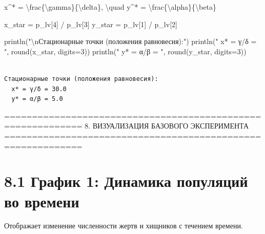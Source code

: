 \documentclass[
  12pt,
  a4paper,
  DIV=11,
  numbers=noendperiod]{scrreprt}
\newenvironment{Shaded}{\begin{snugshade}}{\end{snugshade}}
\newcommand{\FloatTok}[1]{\textcolor[rgb]{0.68,0.00,0.00}{#1}}
\newcommand{\FunctionTok}[1]{\textcolor[rgb]{0.28,0.35,0.67}{#1}}
\newcommand{\NormalTok}[1]{\textcolor[rgb]{0.00,0.23,0.31}{#1}}
\newcommand{\OperatorTok}[1]{\textcolor[rgb]{0.37,0.37,0.37}{#1}}
\newcommand{\SpecialCharTok}[1]{\textcolor[rgb]{0.37,0.37,0.37}{#1}}
\newcommand{\StringTok}[1]{\textcolor[rgb]{0.13,0.47,0.30}{#1}}
\begin{document}
\begin{Shaded}
\begin{Highlighting}[]
\NormalTok{x\^{}* = \textbackslash{}frac\{\textbackslash{}gamma\}\{\textbackslash{}delta\}, \textbackslash{}quad y\^{}* = \textbackslash{}frac\{\textbackslash{}alpha\}\{\textbackslash{}beta\}}
\end{Highlighting}
\end{Shaded}

\begin{Shaded}
\begin{Highlighting}[]
\NormalTok{x\_star }\OperatorTok{=}\NormalTok{ p\_lv[}\FloatTok{4}\NormalTok{] }\OperatorTok{/}\NormalTok{ p\_lv[}\FloatTok{3}\NormalTok{]}
\NormalTok{y\_star }\OperatorTok{=}\NormalTok{ p\_lv[}\FloatTok{1}\NormalTok{] }\OperatorTok{/}\NormalTok{ p\_lv[}\FloatTok{2}\NormalTok{]}

\FunctionTok{println}\NormalTok{(}\StringTok{"}\SpecialCharTok{\textbackslash{}n}\StringTok{Стационарные точки (положения равновесия):"}\NormalTok{)}
\FunctionTok{println}\NormalTok{(}\StringTok{"  x* = γ/δ = "}\NormalTok{, }\FunctionTok{round}\NormalTok{(x\_star, digits}\OperatorTok{=}\FloatTok{3}\NormalTok{))}
\FunctionTok{println}\NormalTok{(}\StringTok{"  y* = α/β = "}\NormalTok{, }\FunctionTok{round}\NormalTok{(y\_star, digits}\OperatorTok{=}\FloatTok{3}\NormalTok{))}
\end{Highlighting}
\end{Shaded}

\begin{verbatim}

Стационарные точки (положения равновесия):
  x* = γ/δ = 30.0
  y* = α/β = 5.0
\end{verbatim}

============================================================ 8.
ВИЗУАЛИЗАЦИЯ БАЗОВОГО ЭКСПЕРИМЕНТА
============================================================

\section{8.1 График 1: Динамика популяций во
времени}\label{ux433ux440ux430ux444ux438ux43a-1-ux434ux438ux43dux430ux43cux438ux43aux430-ux43fux43eux43fux443ux43bux44fux446ux438ux439-ux432ux43e-ux432ux440ux435ux43cux435ux43dux438}

Отображает изменение численности жертв и хищников с течением времени.
\end{document}
